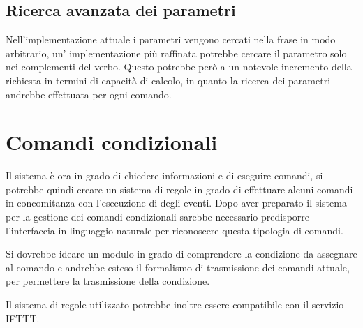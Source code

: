 \documentclass[twoside]{supsistudent}
\begin{document}
\subsection{Ricerca avanzata dei parametri}
Nell'implementazione attuale i parametri vengono cercati nella frase in modo arbitrario, un' implementazione più raffinata potrebbe cercare il parametro solo nei complementi del verbo. Questo potrebbe però a un notevole incremento della richiesta in termini di capacità di calcolo, in quanto la ricerca dei parametri andrebbe effettuata per ogni comando.

\section{Comandi condizionali}
Il sistema è ora in grado di chiedere informazioni e di eseguire comandi, si potrebbe quindi creare un sistema di regole in grado di effettuare alcuni comandi in concomitanza con l'esecuzione di degli eventi.
Dopo aver preparato il sistema per la gestione dei comandi condizionali sarebbe necessario predisporre l'interfaccia in linguaggio naturale per riconoscere questa tipologia di comandi.

Si dovrebbe ideare un modulo in grado di comprendere la condizione da assegnare al comando e andrebbe esteso il formalismo di trasmissione dei comandi attuale, per permettere la trasmissione della condizione.

Il sistema di regole utilizzato potrebbe inoltre essere compatibile con il servizio IFTTT.\cite{ifttt}
\end{document}
